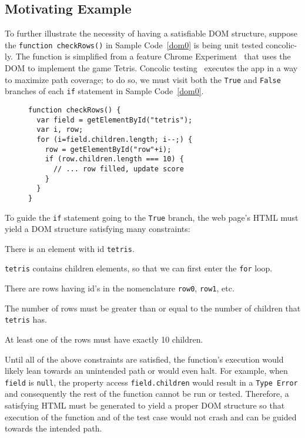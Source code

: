 \subsection{Motivating Example}
To further illustrate the necessity of having a satisfiable DOM structure, suppose the {\tt function checkRows()} in Sample Code~\ref{dom0} is being unit tested concolic-ly.  
The function is simplified from a feature Chrome Experiment~\cite{domtris} that uses the DOM to implement the game Tetris.  
Concolic testing~\cite{cute} executes the app in a way to maximize path coverage; to do so, we must visit both the {\tt True} and {\tt False} branches of each {\tt if} statement in Sample Code~\ref{dom0}.  
\begin{figure}
\begin{lstlisting}[caption=Example code whose tests and execution depend on the Document Object Model having a precise tree structure. {\tt getElementById()} is equivalent to {\tt document.getElementById()}.,label=dom0]
function checkRows() {
  var field = getElementById("tetris"); 
  var i, row;
  for (i=field.children.length; i--;) {
    row = getElementById("row"+i);
    if (row.children.length === 10) {
      // ... row filled, update score
    }
  }
}
\end{lstlisting}
\end{figure}

To guide the {\tt if} statement going to the {\tt True} branch, the web page's HTML must yield a DOM structure satisfying many constraints:
\begin {compactitem}
\item There is an element with id {\tt tetris}.
\item {\tt tetris} contains children elements, so that we can first enter the {\tt for} loop.
\item There are rows having id's in the nomenclature {\tt row0}, {\tt row1}, etc.
\item The number of rows must be greater than or equal to the number of children that {\tt tetris} has.
\item At least one of the rows must have exactly 10 children.
\end {compactitem}

Until all of the above constraints are satisfied, the function's execution would likely lean towards an unintended path or would even halt.   
For example, when {\tt field} is {\tt null}, the property access {\tt field.children} would result in a {\tt Type Error} and consequently the rest of the function cannot be run or tested.  
Therefore, a satisfying HTML must be generated to yield a proper DOM structure so that execution of the function and of the test case would not crash and can be guided towards the intended path.  

